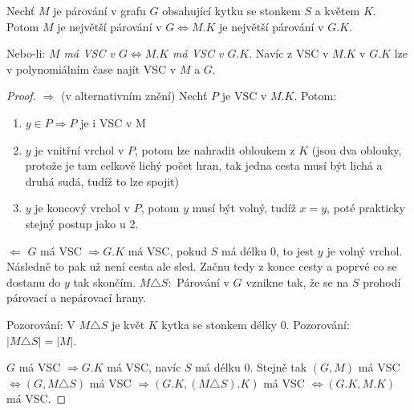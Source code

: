 \begin{lemma}
	Nechť $M$ je párování v grafu $G$ obsahující kytku se stonkem $S$ a květem $K$. Potom $M$ je největší párování v $G \Leftrightarrow M.K$ je největší párování v $G.K$.
\end{lemma}

Nebo-li: \textit{$M$ má VSC v $G \Leftrightarrow M.K$ má VSC v $G.K$}. Navíc z VSC v $M.K$ v $G.K$ lze v polynomiálním čase najít VSC v $M$ a $G$.

\begin{proof}
	$\Rightarrow$ (v alternativním znění) Nechť $P$ je VSC v $M.K$. Potom:
	
	\begin{enumerate}
		\item $y \in P \Rightarrow P$ je i VSC v M
		\item $y$ je vnitřní vrchol v $P$, potom lze nahradit obloukem z $K$ (jsou dva oblouky, protože je tam celkově lichý počet hran, tak jedna cesta musí být lichá a druhá sudá, tudíž to lze spojit)
		\item $y$ je koncový vrchol v $P$, potom $y$ musí být volný, tudíž $x=y$, poté prakticky stejný postup jako u 2.
	\end{enumerate}
	
	$\Leftarrow$ $G$ má VSC $\Rightarrow G.K$ má VSC, pokud $S$ má délku $0$, to jest $y$ je volný vrchol. Následně to pak už není cesta ale sled. Začnu tedy z konce cesty a poprvé co se dostanu do $y$ tak skončím. $M \triangle S:$ Párování v $G$ vznikne tak, že se na $S$ prohodí párovací a nepárovací hrany.
	
	Pozorování: V $M \triangle S$ je květ $K$ kytka se stonkem délky $0$. Pozorování: $|M \triangle S| = |M|$.
	
	$G$ má VSC $\Rightarrow G.K$ má VSC, navíc $S$ má délku $0$. Stejně tak $(G,M)$ má VSC $\Leftrightarrow (G, M \triangle S)$ má VSC $\Rightarrow (G.K, (M \triangle S).K)$ má VSC $\Leftrightarrow (G.K, M.K)$ má VSC.
\end{proof}

